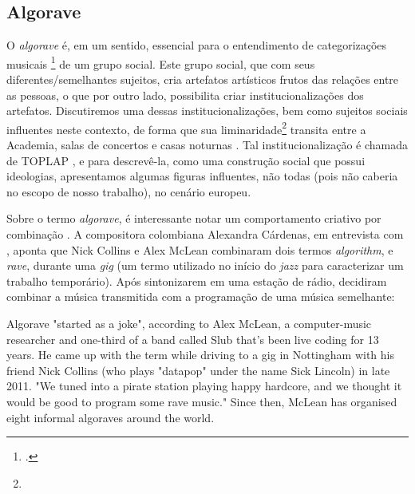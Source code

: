 \subsection{Algorave}\label{sec:algorave}

O \emph{algorave} é, em um sentido, essencial para o entendimento de categorizações musicais \footnote{.} de um grupo social. Este grupo social, que com seus diferentes/semelhantes sujeitos,  cria artefatos artísticos frutos das relações entre as pessoas, o que por outro lado, possibilita criar institucionalizações dos artefatos. Discutiremos uma dessas institucionalizações, bem como sujeitos sociais influentes neste contexto, de forma que sua liminaridade\footnote{} transita entre a Academia, salas de concertos e casas noturnas . Tal institucionalização é chamada de TOPLAP , e para descrevê-la, como uma construção social que possui ideologias, apresentamos algumas figuras influentes, não todas (pois não caberia no escopo de nosso trabalho), no cenário europeu. 

Sobre o termo \emph{algorave}, é interessante notar um comportamento criativo  por combinação . A compositora colombiana Alexandra Cárdenas, em entrevista com , aponta que Nick Collins e Alex McLean combinaram dois termos \emph{algorithm}, e \emph{rave}, durante uma \emph{gig} (um termo utilizado no início do \emph{jazz} para caracterizar um trabalho temporário). Após sintonizarem em uma estação de rádio, decidiram combinar a música transmitida com a programação de uma música semelhante:

\begin{citacao}
{
Algorave "started as a joke", according to Alex McLean, a computer-music researcher and one-third of a band called Slub that's been live coding for 13 years. He came up with the term while driving to a gig in Nottingham with his friend Nick Collins (who plays "datapop" under the name Sick Lincoln) in late 2011. "We tuned into a pirate station playing happy hardcore, and we thought it would be good to program some rave music." Since then, McLean has organised eight informal algoraves around the world. 
}
\end{citacao}

